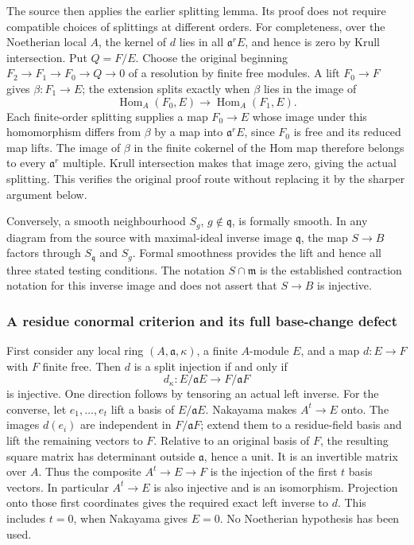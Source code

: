 The source then applies the earlier splitting lemma. Its proof does not require compatible choices of splittings at different orders. For completeness, over the Noetherian local \(A\), the kernel of \(d\) lies in all \(\mathfrak a^rE\), and hence is zero by Krull intersection. Put \(Q=F/E\). Choose the original beginning \(F_2\to F_1\to F_0\to Q\to0\) of a resolution by finite free modules. A lift \(F_0\to F\) gives \(\beta:F_1\to E\); the extension splits exactly when \(\beta\) lies in the image of \[
\operatorname{Hom}_A(F_0,E)\longrightarrow\operatorname{Hom}_A(F_1,E).
\] Each finite-order splitting supplies a map \(F_0\to E\) whose image under this homomorphism differs from \(\beta\) by a map into \(\mathfrak a^rE\), since \(F_0\) is free and its reduced map lifts. The image of \(\beta\) in the finite cokernel of the Hom map therefore belongs to every \(\mathfrak a^r\) multiple. Krull intersection makes that image zero, giving the actual splitting. This verifies the original proof route without replacing it by the sharper argument below.

Conversely, a smooth neighbourhood \(S_g\), \(g\notin\mathfrak q\), is formally smooth. In any diagram from the source with maximal-ideal inverse image \(\mathfrak q\), the map \(S\to B\) factors through \(S_{\mathfrak q}\) and \(S_g\). Formal smoothness provides the lift and hence all three stated testing conditions. The notation \(S\cap\mathfrak m\) is the established contraction notation for this inverse image and does not assert that \(S\to B\) is injective.

\subsubsection{A residue conormal criterion and its full base-change defect}\label{a-residue-conormal-criterion-and-its-full-base-change-defect}

First consider any local ring \((A,\mathfrak a,\kappa)\), a finite \(A\)-module \(E\), and a map \(d:E\to F\) with \(F\) finite free. Then \(d\) is a split injection if and only if \[
d_\kappa:E/\mathfrak aE\longrightarrow F/\mathfrak aF
\] is injective. One direction follows by tensoring an actual left inverse. For the converse, let \(e_1,\ldots,e_t\) lift a basis of \(E/\mathfrak aE\). Nakayama makes \(A^t\to E\) onto. The images \(d(e_i)\) are independent in \(F/\mathfrak aF\); extend them to a residue-field basis and lift the remaining vectors to \(F\). Relative to an original basis of \(F\), the resulting square matrix has determinant outside \(\mathfrak a\), hence a unit. It is an invertible matrix over \(A\). Thus the composite \(A^t\to E\to F\) is the injection of the first \(t\) basis vectors. In particular \(A^t\to E\) is also injective and is an isomorphism. Projection onto those first coordinates gives the required exact left inverse to \(d\). This includes \(t=0\), when Nakayama gives \(E=0\). No Noetherian hypothesis has been used.

